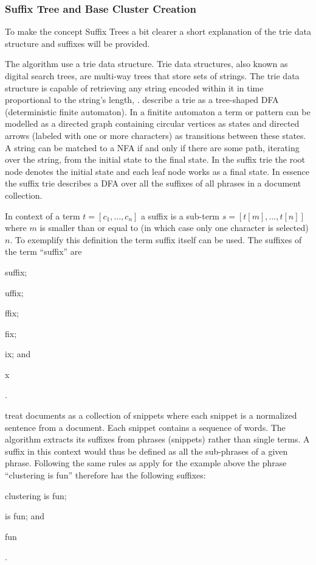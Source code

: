 \subsubsection{Suffix Tree and Base Cluster Creation}

To make the concept Suffix Trees a bit clearer a short explanation of the trie data structure and suffixes will be provided.

The \STC algorithm use a trie data structure. Trie data structures, also known as digital search trees, are multi-way trees that store sets of strings. The trie data structure is capable of retrieving any string encoded within it in time proportional to the string's length, \cite{Baeza-Yates2011c}. \textcite{Baeza-Yates2011c} describe a trie as a tree-shaped DFA (deterministic finite automaton). In a finitite automaton a term or pattern can be modelled as a directed graph containing circular vertices as states and directed arrows (labeled with one or more characters) as transitions between these states. A string can be matched to a NFA if and only if there are some path, iterating over the string, from the initial state to the final state. In the suffix trie the root node denotes the initial state and each leaf node works as a final state. In essence the suffix trie describes a DFA over all the suffixes of all phrases in a document collection.

In context of a term \(t = [c_{1}, ..., c_{n}]\) a suffix is a sub-term \(s = [t[m], ..., t[n]]\) where \(m\) is smaller than or equal to (in which case only one character is selected) \(n\). To exemplify this definition the term suffix itself can be used. The suffixes of the term ``suffix'' are
\begin{inparaenum}[\itshape 1\upshape)]
\item suffix;
\item uffix;
\item ffix;
\item fix;
\item ix; and
\item x
\end{inparaenum}.

\cite{Oren1998} treat documents as a collection of snippets where each snippet is a normalized sentence from a document. Each snippet contains a sequence of words. The \STC algorithm extracts its suffixes from phrases (snippets) rather than single terms. A suffix in this context would thus be defined as all the sub-phrases of a given phrase. Following the same rules as apply for the example above the phrase ``clustering is fun'' therefore has the following suffixes:
\begin{inparaenum}[\itshape 1\upshape)]
\item clustering is fun;
\item is fun; and
\item fun
\end{inparaenum}.

